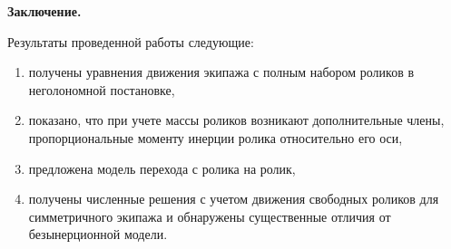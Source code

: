 






%





{\bf Заключение.}

Результаты проведенной работы следующие:
\begin{enumerate}
    \item получены уравнения движения экипажа с полным набором роликов в неголономной постановке,

    \item показано, что при учете массы роликов возникают дополнительные члены, пропорциональные моменту инерции ролика относительно его оси,

    \item предложена модель перехода с ролика на ролик,

    \item получены численные решения с учетом движения свободных роликов для симметричного экипажа и обнаружены существенные отличия от безынерционной модели.
\end{enumerate}



% 














